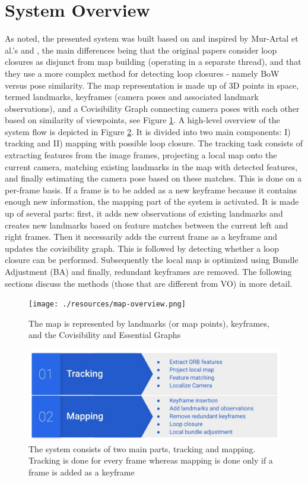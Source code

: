 \documentclass[a4paper, 10pt]{article}
\begin{document}
\section{System Overview}
\label{sec:org5d19458}
As noted, the presented system was built based on and inspired by Mur-Artal et al.'s \cite{os} and \cite{os-II},
the main differences being that the original papers consider loop closures as disjunct from map building (operating in a separate thread), and that they use a more complex method for detecting loop closures - namely BoW versus pose similarity. 
The map representation is made up of 3D points in space, termed landmarks, keyframes (camera poses and associated landmark observations), and a Covisibility Graph connecting camera poses with each other based on 
similarity of viewpoints, see Figure \ref{fig:org0e326e4}.
A high-level overview of the system flow is depicted in Figure \ref{fig:orgdfb26e4}. It is divided into two main components: I) tracking and II) mapping with possible loop closure.
The tracking task consists of extracting features from the image frames, projecting a local map onto the current camera, matching existing landmarks in the map with detected features, 
and finally estimating the camera pose based on these matches.
This is done on a per-frame basis. If a frame is to be added as a new keyframe because it contains enough new information, the mapping part of the system is activated.
It is made up of several parts: first, it adds new observations of existing landmarks and creates new landmarks based on feature matches between the current left and right frames.
Then it necessarily adds the current frame as a keyframe and updates the covisibility graph. This is followed by detecting whether a loop closure can be performed.
Subsequently the local map is optimized using Bundle Adjustment (BA) \cite{ba} and finally, redundant keyframes are removed. The following sections discuss the methods (those that are different from VO) in more detail.

\begin{figure}[htbp]
\centering
\texttt{[image: ./resources/map-overview.png]}
\caption{\label{fig:org0e326e4}
The map is represented by landmarks (or map points), keyframes, and the Covisibility and Essential Graphs}
\end{figure}

\begin{figure}[htbp]
\centering
\includegraphics[width=0.7\linewidth]{./resources/system.jpeg}
\caption{\label{fig:orgdfb26e4}
The system consists of two main parts, tracking and mapping. Tracking is done for every frame whereas mapping is done only if a frame is added as a keyframe}
\end{figure}
\end{document}
